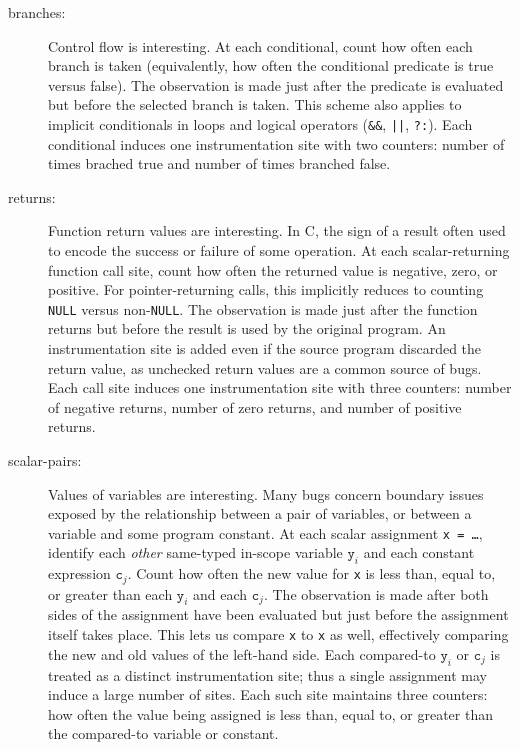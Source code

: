 \documentclass{acm_proc_article-sp}
\begin{document}
\begin{description}
\item[branches:] Control flow is interesting.  At each conditional,
  count how often each branch is taken (equivalently, how often the
  conditional predicate is true versus false).  The observation is
  made just after the predicate is evaluated but before the selected
  branch is taken.  This scheme also applies to implicit conditionals
  in loops and logical operators (\texttt{\&\&}, \texttt{||},
  \texttt{?:}).  Each conditional induces one instrumentation site
  with two counters: number of times brached true and number of times
  branched false.
  
\item[returns:] Function return values are interesting.  In C, the
  sign of a result often used to encode the success or failure of some
  operation.  At each scalar-returning function call site, count how
  often the returned value is negative, zero, or positive.  For
  pointer-returning calls, this implicitly reduces to counting
  \texttt{NULL} versus non-\texttt{NULL}.  The observation is made
  just after the function returns but before the result is used by the
  original program.  An instrumentation site is added even if the
  source program discarded the return value, as unchecked return
  values are a common source of bugs.  Each call site induces one
  instrumentation site with three counters: number of negative
  returns, number of zero returns, and number of positive returns.
  
\item[scalar-pairs:] Values of variables are interesting.  Many bugs
  concern boundary issues exposed by the relationship between a pair
  of variables, or between a variable and some program constant.  At
  each scalar assignment \texttt{x = \dots}, identify each
  \emph{other} same-typed in-scope variable $\mathtt{y}_i$ and each
  constant expression $\mathtt{c}_j$.  Count how often the new value
  for \texttt{x} is less than, equal to, or greater than each
  $\mathtt{y}_i$ and each $\mathtt{c}_j$.  The observation is made
  after both sides of the assignment have been evaluated but just
  before the assignment itself takes place.  This lets us compare
  \texttt{x} to \texttt{x} as well, effectively comparing the new and
  old values of the left-hand side.  Each compared-to $\mathtt{y}_i$
  or $\mathtt{c}_j$ is treated as a distinct instrumentation site;
  thus a single assignment may induce a large number of sites.  Each
  such site maintains three counters: how often the value being
  assigned is less than, equal to, or greater than the compared-to
  variable or constant.
\end{description}
\end{document}
